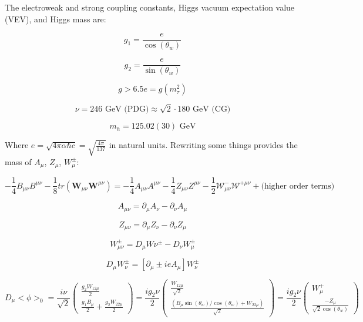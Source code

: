 \documentclass[12pt,a4paper,pagesize=pdftex]{scrartcl}
\newcommand{\icol}[1]{%
  \left(\begin{smallmatrix}#1\end{smallmatrix}\right)%
}
\begin{document}
The electroweak and strong coupling constants, Higgs vacuum expectation value (VEV), and Higgs mass are:

\begin{equation*}
	g_1=\frac{e}{\cos\left(\theta_w\right)}
\end{equation*}

\begin{equation*}
	g_2=\frac{e}{\sin\left(\theta_w\right)}
\end{equation*}

\begin{equation*}
	g>6.5e=g\left(m_\tau^2\right)
\end{equation*}

\begin{equation*}
	\nu=246\text{ GeV (PDG)} \approx \sqrt{2}\cdot180\text{ GeV (CG)}
\end{equation*}

\begin{equation*}
	m_h=125.02(30)\text{ GeV}
\end{equation*}

Where $e=\sqrt{4\pi\alpha\hbar c}=\sqrt{\frac{4\pi}{137}}$ in natural units. Rewriting some things provides the mass of $A_\mu$, $Z_\mu$, $W_\mu^\pm$:

\begin{equation*}
	-\frac{1}{4}B_{\mu\nu}B^{\mu\nu}-\frac{1}{8}tr\left(\mathbf{W}_{\mu\nu}\mathbf{W}^{\mu\nu}\right)=-\frac{1}{4}A_{\mu\nu}A^{\mu\nu}-\frac{1}{4}Z_{\mu\nu}Z^{\mu\nu}-\frac{1}{2}\mathcal{W}_{\mu\nu}^-\mathcal{W}^{+\mu\nu}+\text{(higher order terms)}
\end{equation*}

\begin{equation*}
	A_{\mu\nu}=\partial_\mu A_\nu-\partial_\nu A_\mu
\end{equation*}

\begin{equation*}
	Z_{\mu\nu}=\partial_\mu Z_\nu-\partial_\nu Z_\mu
\end{equation*}

\begin{equation*}
	W_{\mu\nu}^\pm=D_\mu W\nu^\pm - D_\nu W_\mu^\pm
\end{equation*}

\begin{equation*}
	D_\mu W_\nu^\pm = \left[\partial_\mu \pm ieA_\mu\right] W_\nu^\pm
\end{equation*}

\begin{equation*}
	D_\mu<\phi>_0=\frac{i\nu}{\sqrt{2}}\icol{\frac{g_2W_{12\mu}}{2}\\ \frac{g_1B_\mu}{2}+\frac{g_2W_{22\mu}}{2}}=\frac{ig_2\nu}{2}\icol{\frac{W_{12\mu}}{\sqrt{2}}\\ \frac{\left(B_\mu\sin\left(\theta_w\right)/\cos\left(\theta_w\right)+W_{22\mu}\right)}{\sqrt{2}}} = \frac{ig_2\nu}{2}\icol{W_\mu^+\\\frac{-Z_\mu}{\sqrt{2}\cos\left(\theta_w\right)}}
\end{equation*}
\end{document}
